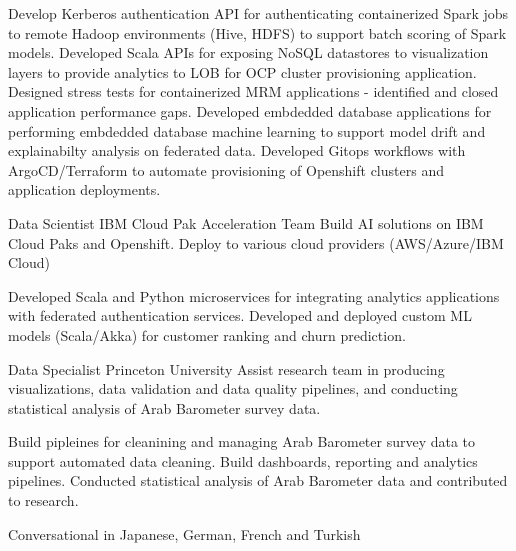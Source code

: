 \documentclass[a4paper]{Resume}
\begin{document}
{Develop Kerberos authentication API for authenticating containerized Spark jobs to remote Hadoop environments (Hive, HDFS) to support batch scoring of Spark models.}
{Developed Scala APIs for exposing NoSQL datastores to visualization layers to provide analytics to LOB for OCP cluster provisioning application.}
{Designed stress tests for containerized MRM applications - identified and closed application performance gaps.}
{Developed embdedded database applications for performing embdedded database machine learning to support model drift and explainabilty analysis on federated data.}
{Developed Gitops workflows with ArgoCD/Terraform to automate provisioning of Openshift clusters and application deployments.}


{Data Scientist}
{IBM Cloud Pak Acceleration Team}
{Build AI solutions on IBM Cloud Paks and Openshift. Deploy to various cloud providers (AWS/Azure/IBM Cloud)}

{Developed Scala and Python microservices for integrating analytics applications with federated authentication services.}
{Developed and deployed custom ML models (Scala/Akka) for customer ranking and churn prediction.}


{Data Specialist}
{Princeton University}
{Assist research team in producing visualizations, data validation and data quality pipelines, and conducting statistical analysis of Arab Barometer survey data.}

{Build pipleines for cleanining and managing Arab Barometer survey data to support automated data cleaning.}
{Build dashboards, reporting and analytics pipelines. Conducted statistical analysis of Arab Barometer data and contributed to research.}




         

		  {Conversational  in Japanese,}
		  {German,}
		  {French and}
		  {Turkish}
          
\clearpage
 
\end{document}
